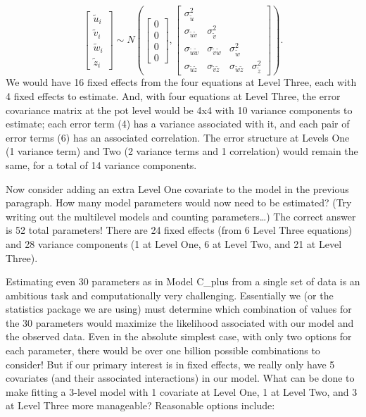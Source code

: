 \documentclass[
]{krantz}
\begin{document}
\[ \left[ \begin{array}{c}
            \tilde{u}_{i} \\ \tilde{v}_{i} \\ \tilde{w}_{i} \\ \tilde{z}_{i}
          \end{array}  \right] \sim N \left( \left[
          \begin{array}{c}
            0 \\ 0 \\ 0 \\ 0
          \end{array} \right], \left[
          \begin{array}{cccc}
            \sigma_{\tilde{u}}^{2} & & & \\
            \sigma_{\tilde{u}\tilde{v}} & \sigma_{\tilde{v}}^{2} & & \\
            \sigma_{\tilde{u}\tilde{w}} & \sigma_{\tilde{v}\tilde{w}} & \sigma_{\tilde{w}}^{2} & \\
            \sigma_{\tilde{u}\tilde{z}} & \sigma_{\tilde{v}\tilde{z}} & \sigma_{\tilde{w}\tilde{z}} & \sigma_{\tilde{z}}^{2}
          \end{array} \right] \right). \]
We would have 16 fixed effects from the four equations at Level Three, each with 4 fixed effects to estimate. And, with four equations at Level Three, the error covariance matrix at the pot level would be 4x4 with 10 variance components to estimate; each error term (4) has a variance associated with it, and each pair of error terms (6) has an associated correlation. The error structure at Levels One (1 variance term) and Two (2 variance terms and 1 correlation) would remain the same, for a total of 14 variance components.

Now consider adding an extra Level One covariate to the model in the previous paragraph. How many model parameters would now need to be estimated? (Try writing out the multilevel models and counting parameters\ldots) The correct answer is 52 total parameters! There are 24 fixed effects (from 6 Level Three equations) and 28 variance components (1 at Level One, 6 at Level Two, and 21 at Level Three).

Estimating even 30 parameters as in Model C\_plus from a single set of data is an ambitious task and computationally very challenging. Essentially we (or the statistics package we are using) must determine which combination of values for the 30 parameters would maximize the likelihood associated with our model and the observed data. Even in the absolute simplest case, with only two options for each parameter, there would be over one billion possible combinations to consider! But if our primary interest is in fixed effects, we really only have 5 covariates (and their associated interactions) in our model. What can be done to make fitting a 3-level model with 1 covariate at Level One, 1 at Level Two, and 3 at Level Three more manageable? Reasonable options include:
\end{document}
